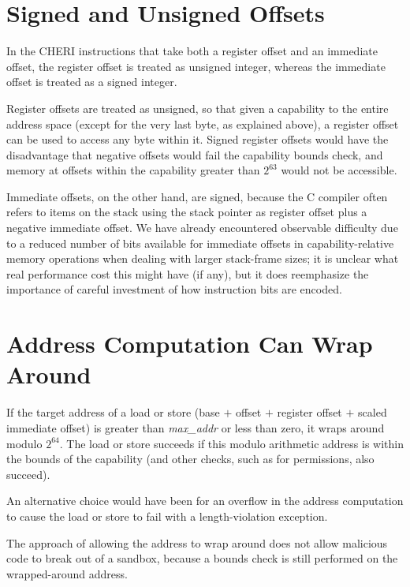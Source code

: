 \section{Signed and Unsigned Offsets}

In the CHERI instructions that take both a register offset and an immediate
offset, the register offset is treated as unsigned integer, whereas the
immediate offset is treated as a signed integer.

Register offsets are treated as unsigned, so that given a capability to
the entire address space (except for the very last byte, as
explained above), a register offset can be used to access any byte within it.
Signed register offsets would have the disadvantage that negative offsets
would fail the capability bounds check, and memory at offsets within the
capability greater than $2^{63}$ would not be accessible.

Immediate offsets, on the other hand, are signed, because the C compiler
often refers to items on the stack using the stack pointer as register
offset plus a negative immediate offset.
We have already encountered observable difficulty due to a reduced number of
bits available for immediate offsets in capability-relative memory operations
when dealing with larger stack-frame sizes; it is unclear what real
performance cost this might have (if any), but it does reemphasize the
importance of careful investment of how instruction bits are encoded.

\section{Address Computation Can Wrap Around}

If the target address of a load or store (base $+$ offset $+$ register offset
$+$ scaled immediate offset) is greater than \emph{max\_addr} or less than
zero, it wraps around modulo $2^{64}$. The load or store succeeds if this
modulo arithmetic address is within the bounds of the capability (and other
checks, such as for permissions, also succeed).

An alternative choice would have been for an overflow in the address computation
to cause the load or store to fail with a length-violation exception.

The approach of allowing the address to wrap around does not allow malicious
code to break out of a sandbox, because a bounds check is still performed on
the wrapped-around address.

